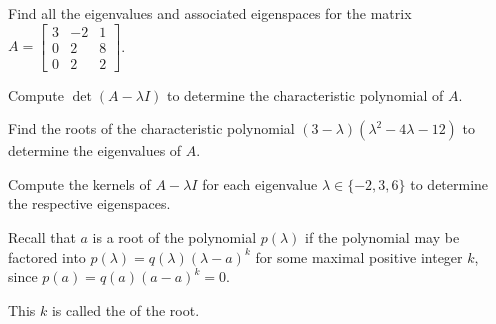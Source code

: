 \begin{applicationActivities}{3}{27}
\begin{activity}{15}
  Find all the eigenvalues and associated eigenspaces for the matrix $A=\begin{bmatrix} 3 & -2 & 1 \\  0 & 2 & 8 \\ 0 & 2 & 2 \end{bmatrix}$.

\begin{subactivity}
 Compute $\det (A-\lambda I)$ to determine the characteristic polynomial of $A$.
\end{subactivity}
\begin{subactivity}
Find the roots of the characteristic polynomial
\((3-\lambda)(\lambda^2-4\lambda-12)\)
to determine the eigenvalues of $A$.
\end{subactivity}
\begin{subactivity}
Compute the kernels of $A-\lambda I$ for each eigenvalue
$\lambda\in\{-2,3,6\}$ to determine the respective eigenspaces.
\end{subactivity}
\end{activity}

\begin{observation}
  Recall that \(a\) is a root of the polynomial \(p(\lambda)\) if
  the polynomial may be factored into \(p(\lambda)=q(\lambda)(\lambda-a)^k\)
  for some maximal positive integer \(k\), since \(p(a)=q(a)(a-a)^k=0\).

  This \(k\) is called the  of the root.
\end{observation}

\end{applicationActivities}
